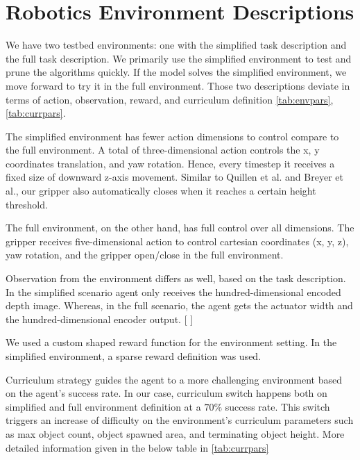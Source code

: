 \section{Robotics Environment Descriptions}

We have two testbed environments: one with the simplified task description and the full task description. We primarily use the simplified environment to test and prune the algorithms quickly. If the model solves the simplified environment, we move forward to try it in the full environment. Those two descriptions deviate in terms of action, observation, reward, and curriculum definition \ref{tab:envpars}, \ref{tab:currpars}. 

The simplified environment has fewer action dimensions to control compare to the full environment. A total of three-dimensional action controls the x, y coordinates translation, and yaw rotation. Hence, every timestep it receives a fixed size of downward z-axis movement. Similar to Quillen et al. and Breyer et al., our gripper also automatically closes when it reaches a certain height threshold.

The full environment, on the other hand, has full control over all dimensions. The gripper receives five-dimensional action to control cartesian coordinates (x, y, z), yaw rotation, and the gripper open/close in the full environment. 

Observation from the environment differs as well, based on the task description. In the simplified scenario agent only receives the hundred-dimensional encoded depth image. Whereas, in the full scenario, the agent gets the actuator width and the hundred-dimensional encoder output. [ ]

We used a custom shaped reward function for the environment setting. In the simplified environment, a sparse reward definition was used. 

Curriculum strategy guides the agent to a more challenging environment based on the agent's success rate. In our case, curriculum switch happens both on simplified and full environment definition at a \(70\%\) success rate. This switch triggers an increase of difficulty on the environment's curriculum parameters such as max object count, object spawned area, and terminating object height. More detailed information given in the below table in \ref{tab:currpars}


